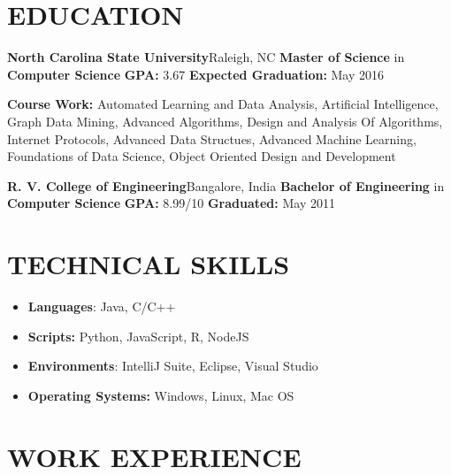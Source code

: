 \documentclass[10pt, letterpaper]{article}
\begin{document}
	\begin{multicols}{2}
		\section*{EDUCATION}
			{\bfseries \large North Carolina State University}\hfill Raleigh, NC\newline
			{\bfseries Master of Science} in {\bfseries Computer Science} \newline
			{\bfseries GPA:} 3.67 \hfill {\bfseries Expected Graduation:} May 2016\par
			{\bfseries Course Work:} Automated Learning and Data Analysis, Artificial Intelligence, Graph Data Mining, Advanced Algorithms, Design and Analysis Of Algorithms, Internet Protocols, Advanced Data Structues, Advanced Machine Learning, Foundations of Data Science, Object Oriented Design and Development\newline
			\par
			{\bfseries \large R. V. College of Engineering}\hfill Bangalore, India\newline
			{\bfseries Bachelor of Engineering} in {\bfseries Computer Science} \newline
			{\bfseries GPA:} 8.99/10 \hfill {\bfseries Graduated:} May 2011

		\section*{TECHNICAL SKILLS}		
			\begin{itemize}[nolistsep,leftmargin=*]
				\item \textbf{Languages}: Java, C/C++
				\item \textbf{Scripts:} Python, JavaScript, R, NodeJS
				\item \textbf{Environments}: IntelliJ Suite, Eclipse, Visual Studio
				\item \textbf{Operating Systems:} Windows, Linux, Mac OS
			\end{itemize}

		\section*{WORK EXPERIENCE}


\end{multicols}
\end{document}
